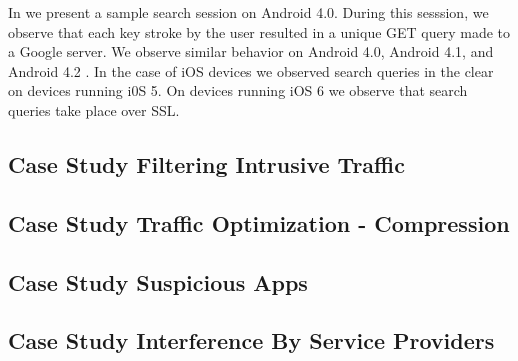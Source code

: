 In  we present a sample search session on
Android 4.0. During this sesssion, we observe that each key stroke by
the user resulted in a unique GET query made to a Google server. We
observe similar behavior on Android 4.0, Android 4.1, and Android 4.2
. In the case of iOS devices we observed search queries
in the clear on devices running i0S 5. On devices running iOS 6 we
observe that search queries take place over SSL. 


\subsection{Case Study Filtering Intrusive Traffic}
\label{sec:case-study-filtering}

\subsection{Case Study Traffic Optimization - Compression}
\label{sec:case-study-compression}

\subsection{Case Study Suspicious Apps}
\label{sec:case-study-susp}

\subsection{Case Study Interference By Service Providers}
\label{sec:case-study-interf}








 




